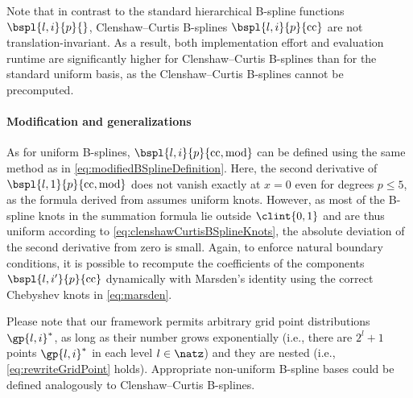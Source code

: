 Note that in contrast to the standard hierarchical B-spline functions
$\bspl{l,i}{p}{}$, Clenshaw--Curtis B-splines
$\bspl{l,i}{p}{\cc}$ are not translation-invariant.
As a result, both implementation effort and evaluation runtime
are significantly higher for Clenshaw--Curtis B-splines than
for the standard uniform basis,
as the Clenshaw--Curtis B-splines cannot be precomputed.

\paragraph{Modification and generalizations}

As for uniform B-splines,
$\bspl{l,i}{p}{\cc,\modified}$ can be defined using the
same method as in \eqref{eq:modifiedBSplineDefinition}.
Here, the second derivative of $\bspl{l,1}{p}{\cc,\modified}$
does not vanish exactly at $x = 0$ even for degrees $p \le 5$,
as the formula derived from  assumes uniform knots.
However, as most of the B-spline knots in the summation formula
lie outside $\clint{0, 1}$ and are thus uniform according
to \eqref{eq:clenshawCurtisBSplineKnots},
the absolute deviation of the second derivative from zero is small.
Again, to enforce natural boundary conditions,
it is possible to recompute the coefficients
of the components $\bspl{l,i'}{p}{\cc}$
dynamically with Marsden's identity using the correct Chebyshev knots
in \eqref{eq:marsden}.

Please note that our framework permits arbitrary grid point distributions
$\gp{l,i}^\ast$,
as long as their number grows exponentially
(i.e., there are $2^l + 1$ points $\gp{l,i}^\ast$ in each level $l \in \natz$)
and they are nested
(i.e., \eqref{eq:rewriteGridPoint} holds).
Appropriate non-uniform B-spline bases could be defined analogously
to Clenshaw--Curtis B-splines.

